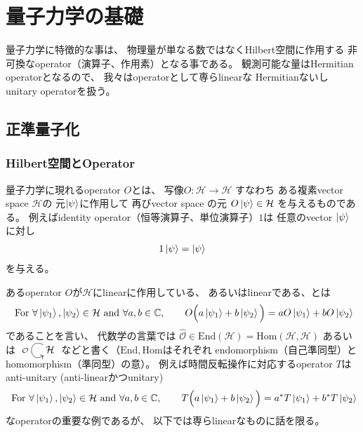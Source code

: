 \section{量子力学の基礎}

量子力学に特徴的な事は、
物理量が単なる数ではなくHilbert空間に作用する
非可換なoperator（演算子、作用素）となる事である。
観測可能な量はHermitian operatorとなるので、
我々はoperatorとして専らlinearな
Hermitianないしunitary operatorを扱う。

\subsection{正準量子化}

\subsubsection{Hilbert空間とOperator}

量子力学に現れるoperator $O$とは、
写像$O: \mathcal{H} \to \mathcal{H}$
すなわち
ある複素vector space $\mathcal{H}$の
元$\ket{\psi}$に作用して
再びvector space の元
$O\ket{\psi} \in \mathcal{H}$
を与えるものである。
例えばidentity operator（恒等演算子、単位演算子）$1$は
任意のvector $\ket{\psi}$に対し
\begin{align}
    1 \ket{\psi} = \ket{\psi}
\end{align}
を与える。

あるoperator $O$が$\mathcal{H}$にlinearに作用している、
あるいはlinearである、とは
\begin{align}
    \text{ For }
        \forall \ket{\psi_1}, \ket{\psi_2}
        \in \mathcal{H}
    \text{ and }
        \forall a,b\in \mathbb{C}
    ,\qquad
        O\Big(
            a \ket{\psi_1}
            +
            b \ket{\psi_2}
        \Big)
    =
        a O \ket{\psi_1}
        +
        b O \ket{\psi_2}
\end{align}
であることを言い、
代数学の言葉では
$\hat{ \mathcal{O} } \in \mathrm{End}(\mathcal{H})
= \mathrm{Hom}(\mathcal{H}, \mathcal{H}) $
あるいは
$\xymatrix{
    \mathcal{H}\ar@(ul,dl)[]_{ \hat{\mathcal{O}} }
}$
などと書く（$\mathrm{End}, \mathrm{Hom}$はそれぞれ
endomorphism（自己準同型）とhomomorphism（準同型）の意）。
例えば時間反転操作に対応するoperator $T$は
anti-unitary (anti-linearかつunitary)
\begin{align}
    \text{ For }
        \forall \ket{\psi_1}, \ket{\psi_2}
        \in \mathcal{H}
    \text{ and }
        \forall a,b\in \mathbb{C}
    ,\qquad
        T\Big(
            a \ket{\psi_1}
            +
            b \ket{\psi_2}
        \Big)
    =
        a^* T \ket{\psi_1}
        +
        b^* T \ket{\psi_2}
\end{align}
なoperatorの重要な例であるが、
以下では専らlinearなものに話を限る。

